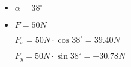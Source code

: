 \documentclass[../practica_01.tex]{subfiles}
\begin{document}
\begin{itemize}
    \item $\alpha = 38^{\circ}$
    \item $F = 50 N$
    
    $F_x = 50N \cdot \cos 38^{\circ} = 39.40N$

    $F_y = 50N \cdot \sin 38^{\circ} = -30.78N$
    
\end{itemize}
\end{document}
